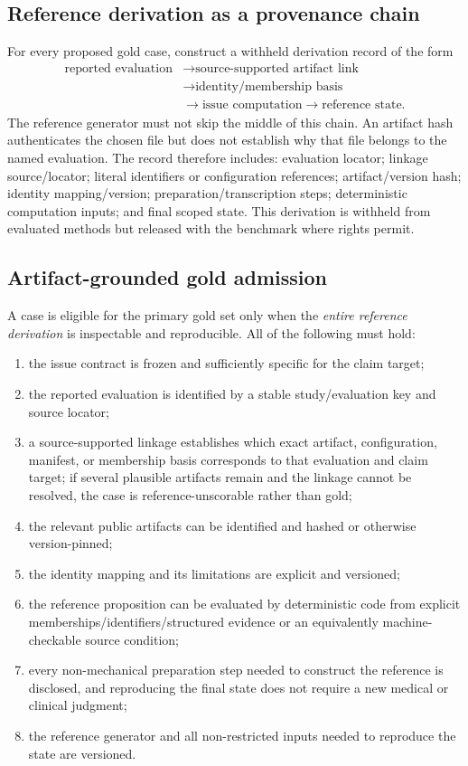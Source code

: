 \documentclass[11pt,a4paper]{article}
\begin{document}
\subsection{Reference derivation as a provenance chain}
For every proposed gold case, construct a withheld derivation record of the form
\[
\begin{aligned}
\text{reported evaluation} &\rightarrow \text{source-supported artifact link}\\
&\rightarrow \text{identity/membership basis}\\
&\rightarrow \text{issue computation} \rightarrow \text{reference state}.
\end{aligned}
\]
The reference generator must not skip the middle of this chain. An artifact hash authenticates the chosen file but does not establish why that file belongs to the named evaluation. The record therefore includes: evaluation locator; linkage source/locator; literal identifiers or configuration references; artifact/version hash; identity mapping/version; preparation/transcription steps; deterministic computation inputs; and final scoped state. This derivation is withheld from evaluated methods but released with the benchmark where rights permit.

\subsection{Artifact-grounded gold admission}
A case is eligible for the primary gold set only when the \emph{entire reference derivation} is inspectable and reproducible. All of the following must hold:
\begin{enumerate}
\item the issue contract is frozen and sufficiently specific for the claim target;
\item the reported evaluation is identified by a stable study/evaluation key and source locator;
\item a source-supported linkage establishes which exact artifact, configuration, manifest, or membership basis corresponds to that evaluation and claim target; if several plausible artifacts remain and the linkage cannot be resolved, the case is reference-unscorable rather than gold;
\item the relevant public artifacts can be identified and hashed or otherwise version-pinned;
\item the identity mapping and its limitations are explicit and versioned;
\item the reference proposition can be evaluated by deterministic code from explicit memberships/identifiers/structured evidence or an equivalently machine-checkable source condition;
\item every non-mechanical preparation step needed to construct the reference is disclosed, and reproducing the final state does not require a new medical or clinical judgment;
\item the reference generator and all non-restricted inputs needed to reproduce the state are versioned.
\end{enumerate}
\end{document}
